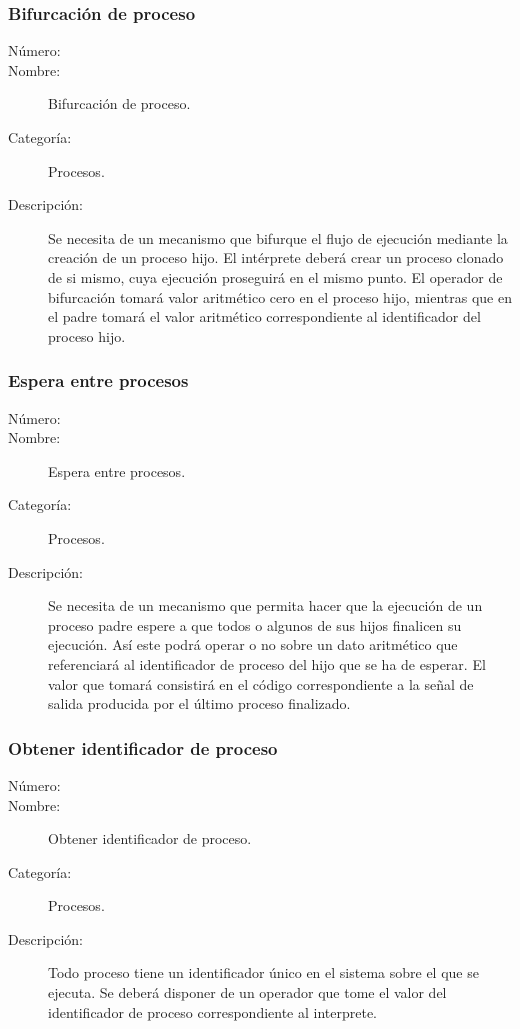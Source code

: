 \subsubsection{Bifurcación de proceso}
\begin{framed}
	\begin{description}
		\item [Número:] \cn
		\item [Nombre:] Bifurcación de proceso.
		\item [Categoría:] Procesos.
		\item [Descripción:] Se necesita de un mecanismo que bifurque el flujo de ejecución mediante la creación de un proceso hijo.
		El intérprete deberá crear un proceso clonado de si mismo, cuya ejecución proseguirá en el mismo punto. El operador 
		de bifurcación tomará valor aritmético cero en el proceso hijo, mientras que en el padre tomará el valor aritmético
		correspondiente al identificador del proceso hijo.    
	\end{description}
\end{framed}

\subsubsection{Espera entre procesos}
\begin{framed}
	\begin{description}
		\item [Número:] \cn
		\item [Nombre:] Espera entre procesos.
		\item [Categoría:] Procesos.
		\item [Descripción:] Se necesita de un mecanismo que permita hacer que la ejecución de un proceso padre espere 
		a que todos o algunos de sus hijos finalicen su ejecución. Así este podrá operar o no sobre un dato aritmético 
		que referenciará al identificador de proceso del hijo que se ha de esperar. El valor que tomará consistirá en
		el código correspondiente a la señal de salida producida por el último proceso finalizado.     
	\end{description}
\end{framed}

\subsubsection{Obtener identificador de proceso}
\begin{framed}
	\begin{description}
		\item [Número:] \cn
		\item [Nombre:] Obtener identificador de proceso.
		\item [Categoría:] Procesos.
		\item [Descripción:] Todo proceso tiene un identificador único en el sistema sobre el que se ejecuta. Se deberá
		disponer de un operador que tome el valor del identificador de proceso correspondiente al interprete.     
	\end{description}
\end{framed}

